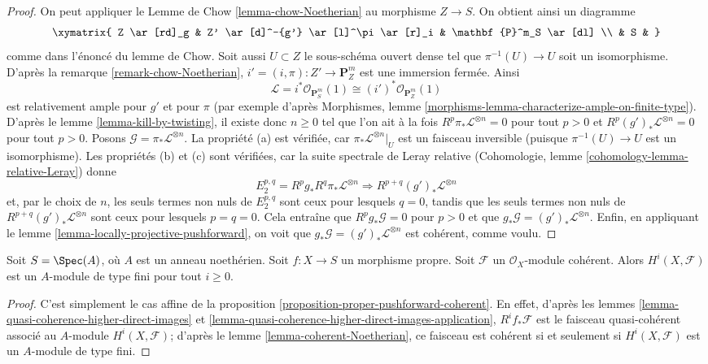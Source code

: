 \begin{proof}
\medskip\noindent
On peut appliquer le Lemme de Chow \ref{lemma-chow-Noetherian}
au morphisme $Z \to S$. On obtient ainsi un diagramme
$$
\xymatrix{
Z \ar[rd]_g & Z' \ar[d]^-{g'} \ar[l]^\pi \ar[r]_i & \mathbf{P}^m_S \ar[dl] \\
& S &
}
$$
comme dans l'énoncé du lemme de Chow. Soit aussi $U \subset Z$ le
sous-schéma ouvert dense tel que $\pi^{-1}(U) \to U$ soit un
isomorphisme. D'après la remarque \ref{remark-chow-Noetherian},
$i' = (i, \pi) : Z' \to \mathbf{P}^m_Z$ est
une immersion fermée. Ainsi
$$
\mathcal{L} = i^*\mathcal{O}_{\mathbf{P}^m_S}(1) \cong
(i')^*\mathcal{O}_{\mathbf{P}^m_Z}(1)
$$
est relativement ample pour $g'$ et pour $\pi$ (par exemple d'après Morphismes,
lemme \ref{morphisms-lemma-characterize-ample-on-finite-type}).
D'après le lemme \ref{lemma-kill-by-twisting},
il existe donc $n \geq 0$ tel que l'on ait à
la fois $R^p\pi_*\mathcal{L}^{\otimes n} = 0$ pour tout $p > 0$ et
$R^p(g')_*\mathcal{L}^{\otimes n} = 0$ pour tout $p > 0$.
Posons $\mathcal{G} = \pi_*\mathcal{L}^{\otimes n}$.
La propriété (a) est vérifiée, car $\pi_*\mathcal{L}^{\otimes n}|_U$ est
un faisceau inversible (puisque $\pi^{-1}(U) \to U$ est un isomorphisme).
Les propriétés (b) et (c) sont vérifiées, car la suite spectrale de
Leray relative
(Cohomologie, lemme \ref{cohomology-lemma-relative-Leray})
donne
$$
E_2^{p, q} = R^pg_* R^q\pi_*\mathcal{L}^{\otimes n}
\Rightarrow
R^{p + q}(g')_*\mathcal{L}^{\otimes n}
$$
et, par le choix de $n$, les seuls termes non nuls de $E_2^{p, q}$ sont
ceux pour lesquels $q = 0$, tandis que les seuls termes non nuls de
$R^{p + q}(g')_*\mathcal{L}^{\otimes n}$ sont ceux pour lesquels $p = q = 0$.
Cela entraîne que $R^pg_*\mathcal{G} = 0$ pour $p > 0$ et
que $g_*\mathcal{G} = (g')_*\mathcal{L}^{\otimes n}$.
Enfin, en appliquant le
lemme \ref{lemma-locally-projective-pushforward},
on voit que $g_*\mathcal{G} = (g')_*\mathcal{L}^{\otimes n}$ est
cohérent, comme voulu.
\end{proof}

\begin{lemma}
\label{lemma-proper-over-affine-cohomology-finite}
Soit $S = \Spec(A)$, où $A$ est un anneau noethérien.
Soit $f : X \to S$ un morphisme propre.
Soit $\mathcal{F}$ un $\mathcal{O}_X$-module cohérent.
Alors $H^i(X, \mathcal{F})$ est un $A$-module de type fini pour tout $i \geq 0$.
\end{lemma}

\begin{proof}
C'est simplement le cas affine de la
proposition \ref{proposition-proper-pushforward-coherent}. En
effet, d'après les lemmes \ref{lemma-quasi-coherence-higher-direct-images} et
\ref{lemma-quasi-coherence-higher-direct-images-application},
$R^if_*\mathcal{F}$ est le faisceau quasi-cohérent
associé au $A$-module $H^i(X, \mathcal{F})$;
d'après le lemme \ref{lemma-coherent-Noetherian}, ce
faisceau est cohérent si et seulement si $H^i(X, \mathcal{F})$
est un $A$-module de type fini.
\end{proof}

